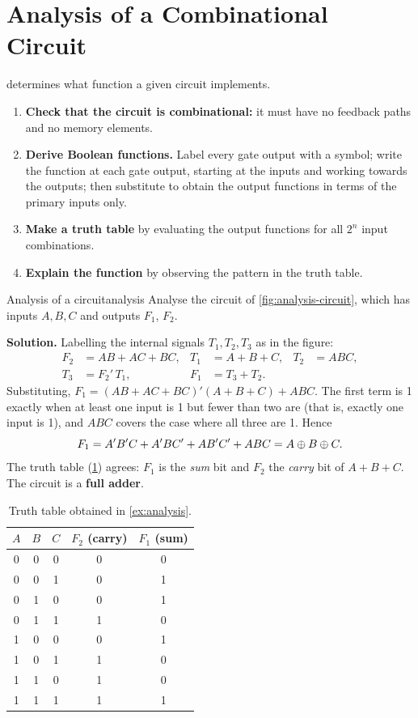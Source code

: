 
\section{Analysis of a Combinational Circuit}\label{sec:analysis}
 determines what function a given circuit implements.
\begin{enumerate}
  \item \textbf{Check that the circuit is combinational:} it must have no feedback paths and no memory elements.
  \item \textbf{Derive Boolean functions.} Label every gate output with a symbol; write the function at each gate output, starting at the inputs and working towards the outputs; then substitute to obtain the output functions in terms of the primary inputs only.
  \item \textbf{Make a truth table} by evaluating the output functions for all $2^n$ input combinations.
  \item \textbf{Explain the function} by observing the pattern in the truth table.
\end{enumerate}

\begin{example}{Analysis of a circuit}{analysis}
Analyse the circuit of \cref{fig:analysis-circuit}, which has inputs $A,B,C$ and outputs $F_1$, $F_2$.

\textbf{Solution.} Labelling the internal signals $T_1,T_2,T_3$ as in the figure:
\begin{align*}
 F_2 &= AB + AC + BC, & T_1 &= A+B+C, & T_2 &= ABC,\\
 T_3 &= F_2'\,T_1, & F_1 &= T_3 + T_2 .
\end{align*}
Substituting, $F_1 = (AB+AC+BC)'(A+B+C) + ABC$. The first term is 1 exactly when at least one input is 1 but fewer than two are (that is, exactly one input is 1), and $ABC$ covers the case where all three are 1. Hence
\[
 F_1 = A'B'C + A'BC' + AB'C' + ABC = A\oplus B\oplus C .
\]
The truth table (\cref{tab:analysis}) agrees: $F_1$ is the \emph{sum} bit and $F_2$ the \emph{carry} bit of $A+B+C$. The circuit is a \textbf{full adder}.
\end{example}

\begin{table}[htbp]
\centering
\caption{Truth table obtained in \cref{ex:analysis}.}
\label{tab:analysis}
\begin{tabular}{ccc|cc}
\toprule
$A$&$B$&$C$&$F_2$ (carry)&$F_1$ (sum)\\ \midrule
0&0&0&0&0\\0&0&1&0&1\\0&1&0&0&1\\0&1&1&1&0\\
1&0&0&0&1\\1&0&1&1&0\\1&1&0&1&0\\1&1&1&1&1\\ \bottomrule
\end{tabular}
\end{table}

